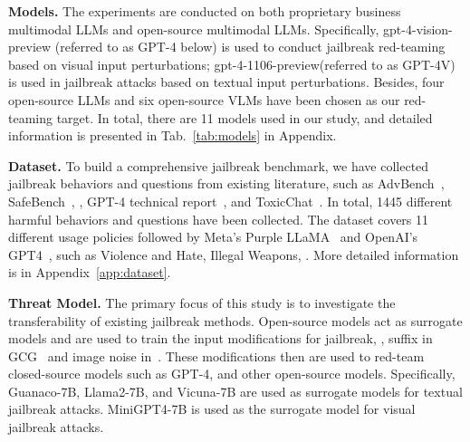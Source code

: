 \noindent\textbf{Models.} The experiments are conducted on both proprietary business multimodal LLMs and open-source multimodal LLMs. Specifically, gpt-4-vision-preview (referred to as GPT-4 below) is used to conduct jailbreak red-teaming based on visual input perturbations; {gpt-4-1106-preview}(referred to as GPT-4V) is used in jailbreak attacks based on textual input perturbations. Besides, four open-source LLMs and six open-source VLMs have been chosen as our red-teaming target. In total, there are 11 models used in our study, and detailed information is presented in Tab.~\ref{tab:models} in Appendix. 

\noindent\textbf{Dataset.} To build a comprehensive jailbreak benchmark, we have collected jailbreak behaviors and questions from existing literature, such as AdvBench~\citep{zou2023universal}, SafeBench~\citep{gong2023figstep}, \cite{qi2023visual}, GPT-4 technical report~\citep{achiam2023gpt}, and ToxicChat~\citep{lin2023toxicchat}. In total, 1445 different harmful behaviors and questions have been collected. The dataset covers 11 different usage policies followed by Meta's Purple LLaMA~\citep{inan2023llama} and OpenAI's GPT4~\citep{achiam2023gpt}, such as Violence and Hate, Illegal Weapons, \etc. More detailed information is in Appendix~\ref{app:dataset}. 

\noindent\textbf{Threat Model.} The primary focus of this study is to investigate the transferability of existing jailbreak methods. Open-source models act as surrogate models and are used to train the input modifications for jailbreak, \eg, suffix in GCG~\citep{zou2023universal} and image noise in~\cite{qi2023visual}. These modifications then are used to red-team closed-source models such as GPT-4, and other open-source models. Specifically,  Guanaco-7B, Llama2-7B, and Vicuna-7B are used as surrogate models for textual jailbreak attacks. MiniGPT4-7B is used as the surrogate model for visual jailbreak attacks. 

